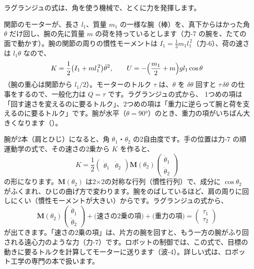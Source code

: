 \label{ph:波-3:sec9}
ラグランジュの式は、角を使う機械で、とくに力を発揮します。

関節のモーターが、長さ $l_1$、質量 $m_1$ の一様な腕（棒）を、真下からはかった角 $\theta$ だけ回し、腕の先に質量 $m$ の荷を持っているとします（力-7 の腕を、たての面で動かす）。腕の関節の周りの慣性モーメントは $I_1=\tfrac13m_1l_1^{\,2}$（力-6）、荷の速さは $l_1\dot\theta$ なので、
\[K=\frac12\bigl(I_1+ml_1^{\,2}\bigr)\dot\theta^2,\qquad U=-\Bigl(\frac{m_1}{2}+m\Bigr)gl_1\cos\theta\]
（腕の重心は関節から $l_1/2$）。モーターのトルク $\tau$ は、$\theta$ を $\delta\theta$ 回すと $\tau\,\delta\theta$ の仕事をするので、一般化力は $Q=\tau$ です。ラグランジュの式から、
1つめの項は「回す速さを変えるのに要るトルク」、2つめの項は「重力に逆らって腕と荷を支えるのに要るトルク」です。腕が水平（$\theta=90°$）のとき、重力の項がいちばん大きくなります（）。

腕が2本（肩とひじ）になると、角 $\theta_1$・$\theta_2$ の2自由度です。手の位置は力-7 の順運動学の式で、その速さの2乗から $K$ を作ると、
\[K=\frac12\begin{pmatrix}\dot\theta_1&\dot\theta_2\end{pmatrix}\mathbf M(\theta_2)\begin{pmatrix}\dot\theta_1\\\dot\theta_2\end{pmatrix}\]
の形になります。$\mathbf M(\theta_2)$ は2×2の対称な行列（慣性行列）で、成分に $\cos\theta_2$ がふくまれ、ひじの曲げ方で変わります。腕をのばしているほど、肩の周りに回しにくい（慣性モーメントが大きい）からです。ラグランジュの式から、
\[\mathbf M(\theta_2)\begin{pmatrix}\ddot\theta_1\\\ddot\theta_2\end{pmatrix}+\bigl(\text{速さの2乗の項}\bigr)+\bigl(\text{重力の項}\bigr)=\begin{pmatrix}\tau_1\\\tau_2\end{pmatrix}\]
が出てきます。「速さの2乗の項」は、片方の腕を回すと、もう一方の腕がふり回される遠心力のような力（力-7）です。ロボットの制御では、この式で、目標の動きに要るトルクを計算してモーターに送ります（波-4）。詳しい式は、ロボット工学の専門の本で扱います。

